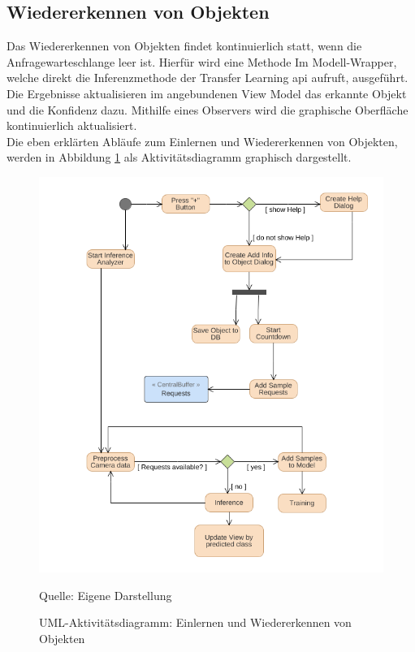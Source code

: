 \documentclass[oneside]{ausarbeitung}
\begin{document}
\subsection{Wiedererkennen von Objekten}
Das Wiedererkennen von Objekten findet kontinuierlich statt, wenn die Anfragewarteschlange leer ist. Hierfür wird eine Methode Im Modell-Wrapper, welche direkt die Inferenzmethode der Transfer Learning \ac{api} aufruft, ausgeführt. Die Ergebnisse aktualisieren im angebundenen View Model das erkannte Objekt und die Konfidenz dazu. Mithilfe eines Observers wird die graphische Oberfläche kontinuierlich aktualisiert.\\
Die eben erklärten Abläufe zum Einlernen und Wiedererkennen von Objekten, werden in Abbildung \ref{fig:activity-diagram-model} als Aktivitätsdiagramm graphisch dargestellt.
\begin{figure}[hptb]
	\centering
	\includegraphics[height=0.6\textheight]{images/addobject-diagram.png}	\caption{UML-Aktivitätsdiagramm: Einlernen und Wiedererkennen von Objekten} Quelle: Eigene Darstellung
	\label{fig:activity-diagram-model}
\end{figure}
\end{document}

